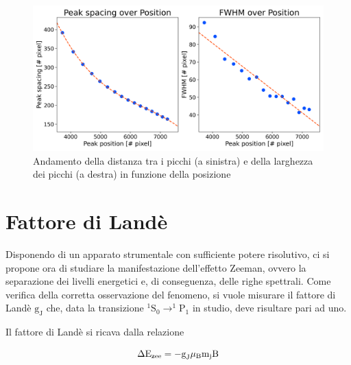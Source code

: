 \documentclass[twocolumn,10pt]{asme2ej}
\begin{document}
\begin{figure}
    \centering
    \includegraphics[width=\linewidth]{../Plots/Boff_spacing_trend.png}
    \caption{Andamento della distanza tra i picchi (a sinistra) e della larghezza dei picchi (a destra) in funzione della posizione}
    \label{i:spacing_trend_Boff}
    \vspace{-10pt}
\end{figure}




\section{Fattore di Landè}\label{s:lande}

Disponendo di un apparato strumentale con sufficiente potere risolutivo, ci si propone ora di studiare la manifestazione
dell'effetto Zeeman, ovvero la separazione dei livelli energetici e, di conseguenza, delle righe spettrali. Come
verifica della corretta osservazione del fenomeno, si vuole misurare il fattore di Landè $\text{g}_{\text{J}}$ che, 
data la transizione $^1\text{S}_0 \rightarrow ^1\text{P}_1$ in studio, deve risultare pari ad uno.

Il fattore di Landè si ricava dalla relazione

\vspace{-15pt}
\begin{equation}
    \Delta \text{E}_{\text{zee}} = - \text{g}_{\text{J}} \mu_{\text{B}} \text{m}_{\text{j}} \text{B} 
    \label{e:gL}
\vspace{-5pt}
\end{equation}
\end{document}
